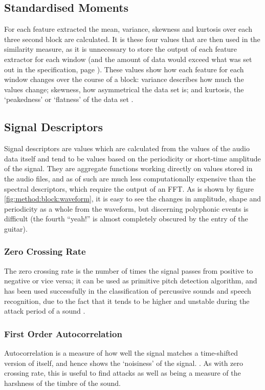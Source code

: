 \subsection{Standardised Moments}
For each feature extracted the mean, variance, skewness and kurtosis over each three second block are calculated. It is these four values that are then used in the similarity measure, as it is unnecessary to store the output of each feature extractor for each window (and the amount of data would exceed what was set out in the specification, page \pageref{text:spec:requirement:data}). These values show how each feature for each window changes over the course of a block: variance describes how much the values change; skewness, how asymmetrical the data set is; and kurtosis, the `peakedness' or `flatness' of the data set \citep{Siegrist2007}.
\subsection{Signal Descriptors}
Signal descriptors are values which are calculated from the values of the audio data itself and tend to be values based on the periodicity or short-time amplitude of the signal. They are aggregate functions working directly on values stored in the audio files, and as of such are much less computationally expensive than the spectral descriptors, which require the output of an FFT. As is shown by figure \ref{fig:method:block:waveform}, it is easy to see the changes in amplitude, shape and periodicity as a whole from the waveform, but discerning polyphonic events is difficult (the fourth ``yeah!'' is almost completely obscured by the entry of the guitar).
\subsubsection{Zero Crossing Rate}

The zero crossing rate is the number of times the signal passes from positive to negative or vice versa; it can be used as primitive pitch detection algorithm, and has been used successfully in the classification of percussive sounds \citep{Gouyon2000} and speech recognition, due to the fact that it tends to be higher and unstable during the attack period of a sound \citep{Schwarz2004}.
\subsubsection{First Order Autocorrelation}

Autocorrelation is a measure of how well the signal matches a time-shifted version of itself, and hence shows the `noisiness' of the signal. \citep{Wikipedia2007}. As with zero crossing rate, this is useful to find attacks as well as being a measure of the harshness of the timbre of the sound.
